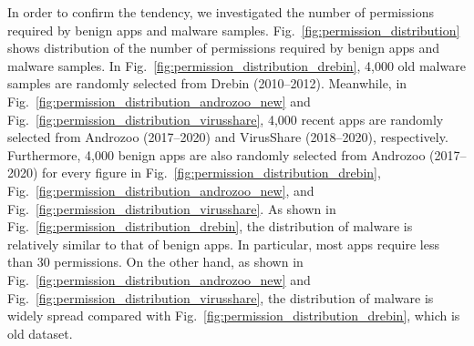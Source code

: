 \documentclass{ieeeaccess}
\newcommand{\myfigurename}{Fig.}
\begin{document}
In order to confirm the tendency, we investigated the number of permissions required by benign apps and malware samples.
\myfigurename~\ref{fig:permission_distribution} shows distribution of the number of permissions required by benign apps and malware samples.
In \myfigurename~\ref{fig:permission_distribution_drebin}, 4,000 old malware samples are randomly selected from Drebin \cite{arp2014drebin} (2010--2012).
Meanwhile, in \myfigurename~\ref{fig:permission_distribution_androzoo_new} and \myfigurename~\ref{fig:permission_distribution_virusshare}, 4,000 recent apps are randomly selected from Androzoo \cite{allix2016androzoo} (2017--2020) and VirusShare \cite{virusshare} (2018--2020), respectively.
Furthermore, 4,000 benign apps are also randomly selected from Androzoo (2017--2020) for every figure in \myfigurename~\ref{fig:permission_distribution_drebin}, \myfigurename~\ref{fig:permission_distribution_androzoo_new}, and \myfigurename~\ref{fig:permission_distribution_virusshare}.
As shown in \myfigurename~\ref{fig:permission_distribution_drebin}, the distribution of malware is relatively similar to that of benign apps.  
In particular, most apps require less than 30 permissions. 
On the other hand, as shown in \myfigurename~\ref{fig:permission_distribution_androzoo_new} and \myfigurename~\ref{fig:permission_distribution_virusshare}, the distribution of malware is widely spread compared with \myfigurename~\ref{fig:permission_distribution_drebin}, which is old dataset.
\end{document}
